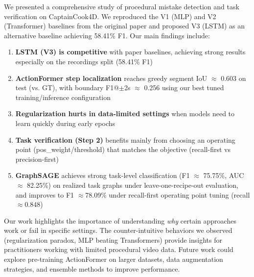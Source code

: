\documentclass[10pt,twocolumn,letterpaper]{article}
\begin{document}
We presented a comprehensive study of procedural mistake detection and task verification on CaptainCook4D. We reproduced the V1 (MLP) and V2 (Transformer) baselines from the original paper and proposed V3 (LSTM) as an alternative baseline achieving 58.41\% F1. Our main findings include:

\begin{enumerate}
    \item \textbf{LSTM (V3) is competitive} with paper baselines, achieving strong results especially on the recordings split (58.41\% F1)
    \item \textbf{ActionFormer step localization} reaches greedy segment IoU $\approx$ 0.603 on test (vs. GT), with boundary F1@$\pm$2s $\approx$ 0.256 using our best tuned training/inference configuration
    \item \textbf{Regularization hurts in data-limited settings} when models need to learn quickly during early epochs
    \item \textbf{Task verification (Step 2)} benefits mainly from choosing an operating point (pos\_weight/threshold) that matches the objective (recall-first vs precision-first)
    \item \textbf{GraphSAGE} achieves strong task-level classification (F1 $\approx$ 75.75\%, AUC $\approx$ 82.25\%) on realized task graphs under leave-one-recipe-out evaluation, and improves to F1 $\approx$78.09\% under recall-first operating point tuning (recall $\approx$0.848)
\end{enumerate}

Our work highlights the importance of understanding \textit{why} certain approaches work or fail in specific settings. The counter-intuitive behaviors we observed (regularization paradox, MLP beating Transformers) provide insights for practitioners working with limited procedural video data. Future work could explore pre-training ActionFormer on larger datasets, data augmentation strategies, and ensemble methods to improve performance.
\end{document}
